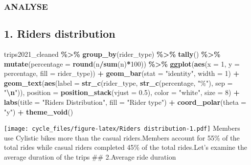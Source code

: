 \documentclass[
]{article}
\newenvironment{Shaded}{\begin{snugshade}}{\end{snugshade}}
\newcommand{\AttributeTok}[1]{\textcolor[rgb]{0.13,0.29,0.53}{#1}}
\newcommand{\DecValTok}[1]{\textcolor[rgb]{0.00,0.00,0.81}{#1}}
\newcommand{\FloatTok}[1]{\textcolor[rgb]{0.00,0.00,0.81}{#1}}
\newcommand{\FunctionTok}[1]{\textcolor[rgb]{0.13,0.29,0.53}{\textbf{#1}}}
\newcommand{\NormalTok}[1]{#1}
\newcommand{\SpecialCharTok}[1]{\textcolor[rgb]{0.81,0.36,0.00}{\textbf{#1}}}
\newcommand{\StringTok}[1]{\textcolor[rgb]{0.31,0.60,0.02}{#1}}
\begin{document}
\hypertarget{analyse}{%
\subsubsection{ANALYSE}\label{analyse}}

\hypertarget{riders-distribution}{%
\subsection{1. Riders distribution}\label{riders-distribution}}

\begin{Shaded}
\begin{Highlighting}[]
\NormalTok{trips2021\_cleaned }\SpecialCharTok{\%\textgreater{}\%} 
  \FunctionTok{group\_by}\NormalTok{(rider\_type) }\SpecialCharTok{\%\textgreater{}\%} 
  \FunctionTok{tally}\NormalTok{() }\SpecialCharTok{\%\textgreater{}\%} 
  \FunctionTok{mutate}\NormalTok{(}\AttributeTok{percentage =} \FunctionTok{round}\NormalTok{(n}\SpecialCharTok{/}\FunctionTok{sum}\NormalTok{(n)}\SpecialCharTok{*}\DecValTok{100}\NormalTok{)) }\SpecialCharTok{\%\textgreater{}\%} 
  \FunctionTok{ggplot}\NormalTok{(}\FunctionTok{aes}\NormalTok{(}\AttributeTok{x =} \DecValTok{1}\NormalTok{, }\AttributeTok{y =}\NormalTok{ percentage, }\AttributeTok{fill =}\NormalTok{ rider\_type)) }\SpecialCharTok{+}
  \FunctionTok{geom\_bar}\NormalTok{(}\AttributeTok{stat =} \StringTok{"identity"}\NormalTok{, }\AttributeTok{width =} \DecValTok{1}\NormalTok{) }\SpecialCharTok{+}
  \FunctionTok{geom\_text}\NormalTok{(}\FunctionTok{aes}\NormalTok{(}\AttributeTok{label =} \FunctionTok{str\_c}\NormalTok{(rider\_type, }\FunctionTok{str\_c}\NormalTok{(percentage, }\StringTok{"\%"}\NormalTok{), }\AttributeTok{sep =} \StringTok{"}\SpecialCharTok{\textbackslash{}n}\StringTok{"}\NormalTok{)), }
            \AttributeTok{position =} \FunctionTok{position\_stack}\NormalTok{(}\AttributeTok{vjust =} \FloatTok{0.5}\NormalTok{), }\AttributeTok{color =} \StringTok{"white"}\NormalTok{, }\AttributeTok{size =} \DecValTok{8}\NormalTok{) }\SpecialCharTok{+} 
  \FunctionTok{labs}\NormalTok{(}\AttributeTok{title =} \StringTok{"Riders Distribution"}\NormalTok{, }\AttributeTok{fill =} \StringTok{"Rider type"}\NormalTok{) }\SpecialCharTok{+} 
  \FunctionTok{coord\_polar}\NormalTok{(}\AttributeTok{theta =} \StringTok{"y"}\NormalTok{) }\SpecialCharTok{+}
  \FunctionTok{theme\_void}\NormalTok{()}
\end{Highlighting}
\end{Shaded}

\texttt{[image: cycle\_files/figure-latex/Riders distribution-1.pdf]}
Members use Cylistic bikes more than the casual riders.Members account
for 55\% of the total rides while casual riders completed 45\% of the
total rides.Let's examine the average duration of the trips \#\#
2.Average ride duration
\end{document}
